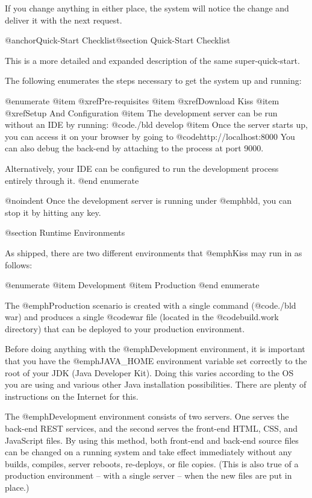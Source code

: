 If you change anything in either place, the system will notice the change 
and deliver it with the next request.


@anchor{Quick-Start Checklist}@section Quick-Start Checklist

This is a more detailed and expanded description of the same
super-quick-start.

The following enumerates the steps necessary to get the system up and running:

@enumerate
@item
@xref{Pre-requisites}
@item
@xref{Download Kiss}
@item
@xref{Setup And Configuration}
@item
The development server can be run without an IDE by running: @code{./bld develop}
@item
Once the server starts up, you can access it on your browser by going to 
@code{http://localhost:8000}  You can also debug the back-end by
attaching to the process at port 9000.

Alternatively, your IDE can be configured to run the development
process entirely through it.
@end enumerate

@noindent Once the development server is running under @emph{bld}, you can stop it 
by hitting any key.

@section Runtime Environments

As shipped, there are two different environments that @emph{Kiss} may
run in as follows:

@enumerate
@item
Development
@item 
Production
@end enumerate

The @emph{Production} scenario is created with a single command
(@code{./bld war}) and produces a single @code{war} file (located in
the @code{build.work} directory) that can be deployed to your production
environment.

Before doing anything with the @emph{Development} environment, it is
important that you have the @emph{JAVA_HOME} environment variable set
correctly to the root of your JDK (Java Developer Kit).  Doing this
varies according to the OS you are using and various other Java
installation possibilities.  There are plenty of instructions on the
Internet for this.

The @emph{Development} environment consists of two servers.  One
serves the back-end REST services, and the second serves the front-end
HTML, CSS, and JavaScript files.  By using this method, both front-end
and back-end source files can be changed on a running system and take
effect immediately without any builds, compiles, server reboots,
re-deploys, or file copies.  (This is also true of a production
environment -- with a single server -- when the new files are put in place.)

